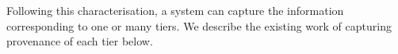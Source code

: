 Following this characterisation, a system can capture the information corresponding to one or many tiers. We describe the existing work of capturing provenance of each tier below.



